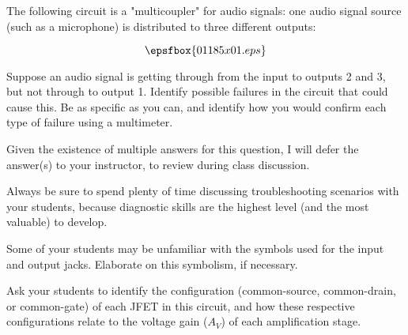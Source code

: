 

The following circuit is a "multicoupler" for audio signals: one audio signal source (such as a microphone) is distributed to three different outputs:

$$\epsfbox{01185x01.eps}$$

Suppose an audio signal is getting through from the input to outputs 2 and 3, but not through to output 1.  Identify possible failures in the circuit that could cause this.  Be as specific as you can, and identify how you would confirm each type of failure using a multimeter.







Given the existence of multiple answers for this question, I will defer the answer(s) to your instructor, to review during class discussion.







Always be sure to spend plenty of time discussing troubleshooting scenarios with your students, because diagnostic skills are the highest level (and the most valuable) to develop.

Some of your students may be unfamiliar with the symbols used for the input and output jacks.  Elaborate on this symbolism, if necessary.

Ask your students to identify the configuration (common-source, common-drain, or common-gate) of each JFET in this circuit, and how these respective configurations relate to the voltage gain ($A_V$) of each amplification stage.




